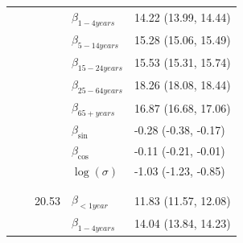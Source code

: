 \documentclass[a4paper,twoside,11pt]{report} %
\theoremstyle{definition}
\theoremstyle{definition}
\theoremstyle{definition}
\theoremstyle{definition}
\theoremstyle{remark}
\begin{document}
\begin{longtable}[t]{llrll}
\hspace{1em}\hspace{1em} &  &  & $\beta_{1-4 years}$ & 14.22 (13.99, 14.44)\\

\hspace{1em}\hspace{1em} &  &  & $\beta_{5-14 years}$ & 15.28 (15.06, 15.49)\\

\hspace{1em}\hspace{1em} &  &  & $\beta_{15-24 years}$ & 15.53 (15.31, 15.74)\\

\hspace{1em}\hspace{1em} &  &  & $\beta_{25-64 years}$ & 18.26 (18.08, 18.44)\\

\hspace{1em}\hspace{1em} &  &  & $\beta_{65+ years}$ & 16.87 (16.68, 17.06)\\

\hspace{1em}\hspace{1em} &  &  & $\beta_{\sin}$ & -0.28 (-0.38, -0.17)\\

\hspace{1em}\hspace{1em} &  &  & $\beta_{\cos}$ & -0.11 (-0.21, -0.01)\\

\hspace{1em}\hspace{1em} &  &  & $\log(\sigma)$ & -1.03 (-1.23, -0.85)\\
\cmidrule{1-5}
\addlinespace[0.3em]
\multicolumn{5}{l}{\textit{\textbf{Poisson Gamma}}}\\
\addlinespace[0.3em]
\multicolumn{5}{l}{\begin{math}\log(\lambda_{it})=\beta(ageGroup_{i})+\log(n_{it})\end{math}}\\
\hspace{1em}\hspace{1em} &  & 20.53 & $\beta_{<1 year}$ & 11.83 (11.57, 12.08)\\

\hspace{1em}\hspace{1em} &  &  & $\beta_{1-4 years}$ & 14.04 (13.84, 14.23)\\


\end{longtable}
\end{document}
